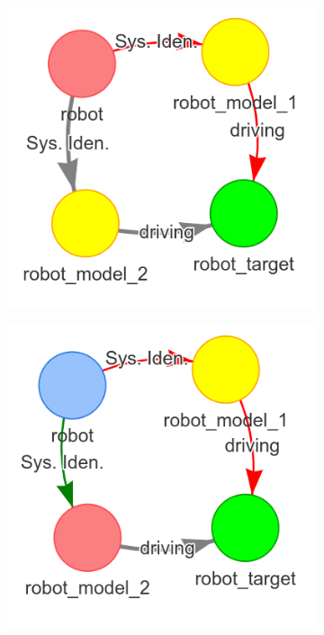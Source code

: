 \begin{figure}[H]
\begin{subfigure}{.3\textwidth}
    \end{subfigure}

    \begin{subfigure}{.3\textwidth}
    \centering
    \includegraphics[width=1\textwidth]{figures/proposed_method/connecting_nodes/failure/fail_5}
    \end{subfigure}
    \begin{subfigure}{.3\textwidth}
    \centering
    \includegraphics[width=1\textwidth]{figures/proposed_method/connecting_nodes/failure/fail_6}

\end{subfigure}
\end{figure}
